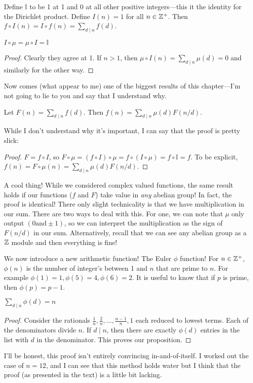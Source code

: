 Define \(\mathbb{I}\) to be 1 at 1 and 0 at all other positive integers---this
it the identity for the Dirichlet product. Define \(I(n)=1\) for all
\(n \in \mathbb{Z}^+\). Then \(f\circ I(n)=I\circ f(n) = \sum_{d\mid n}f(d)\).

\begin{lemma}
  \(I\circ \mu = \mu\circ I = \mathbb{I}\)
\end{lemma}
\begin{proof}
  Clearly they agree at 1. If \(n>1\), then
  \(\mu\circ I(n) = \sum_{d\mid n} \mu(d) =0\) and similarly for the other way.
\end{proof}

Now comes (what appear to me) one of the biggest results of this chapter---I'm
not going to lie to you and say that I understand why.

\begin{theorem}
  Let \(F(n)= \sum_{d\mid n}f(d)\). Then \(f(n) = \sum_{d\mid n}\mu(d) F(n / d)\).
\end{theorem}

While I don't understand why it's important, I can say that the proof is pretty
slick:

\begin{proof}
  \(F= f \circ I\), so
  \(F \circ \mu= (f\circ I) \circ \mu = f \circ (I\circ\mu)=f\circ\mathbb{I} = f\).
  To be explicit, \(f(n) = F\circ\mu(n)=\sum_{d\mid n} \mu(d)F(n / d)\).
\end{proof}

A cool thing! While we considered complex valued functions, the same result
holds if our functions (\(f\) and \(F\)) take value in \emph{any} abelian group! In fact, the
proof is identical! There only slight technicality is that we have multiplication
in our sum. There are two ways to deal with this. For one, we can note that
\(\mu\) only output \((0 \text{and} \pm 1)\), so we can interpret the multiplication as the
sign of \(F( n / d )\) in our sum. Alternatively, recall that we can see any
abelian group as a \(\mathbb{Z} \) module and then everything is fine!

We now introduce a new arithmetic function! The Euler \(\phi\) function! For
\(n \in \mathbb{Z} ^+\), \(\phi(n)\) is the number of integer's between 1 and \(n\) that
are prime to \(n\). For example \(\phi(1)=1,\phi(5)=4,\phi(6)=2\). It is useful
to know that if \(p\) is prime, then \(\phi(p)=p-1\).

\begin{prop}
\(\sum_{d\mid n}\phi(d)=n\)
\end{prop}
\begin{proof}
  Consider the rationals
  \(\frac{1}{n}, \frac{2}{n}, \dots , \frac{n-1}{n}, 1\) each reduced to lowest
  terms. Each of the denominators divide \(n\). If \(d\mid n\), then there are
  exactly \(\phi(d) \) entries in the list with \(d\) in the denominator. This
  proves our proposition.
\end{proof}
\begin{remark}
  I'll be honest, this proof isn't entirely convincing in-and-of-itself. I
  worked out the case of \(n=12\), and I can see that this method holds water
  but I think that the proof (as presented in the text) is a little bit lacking.
\end{remark}

